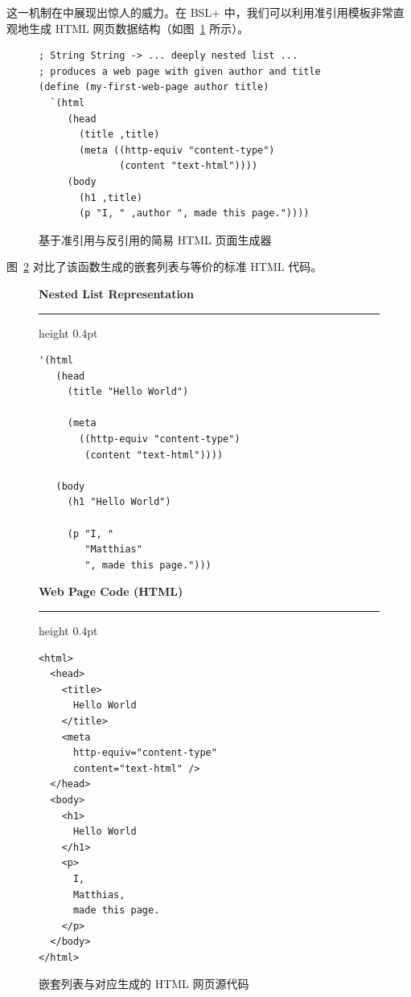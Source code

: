 这一机制在中展现出惊人的威力。在 BSL+ 中，我们可以利用准引用模板非常直观地生成 HTML 网页数据结构（如图~\ref{fig:html_generator} 所示）。

\begin{figure}[htbp]
  \centering
\begin{lstlisting}[language=BSL]
; String String -> ... deeply nested list ...
; produces a web page with given author and title
(define (my-first-web-page author title)
  `(html
     (head
       (title ,title)
       (meta ((http-equiv "content-type")
              (content "text-html"))))
     (body
       (h1 ,title)
       (p "I, " ,author ", made this page."))))
\end{lstlisting}
  \caption{基于准引用与反引用的简易 HTML 页面生成器}
  \label{fig:html_generator}
\end{figure}

图~\ref{fig:nested_lists_webpage} 对比了该函数生成的嵌套列表与等价的标准 HTML 代码。

\begin{figure}[htbp]
  \centering
  \begin{stepperbox}[unbreakable]
    \begin{minipage}[t]{0.47\linewidth}
      \footnotesize\textbf{Nested List Representation}\par
      \vspace{2pt}\hrule height 0.4pt\vspace{3pt}
\begin{Verbatim}[fontsize=\scriptsize]
'(html
   (head
     (title "Hello World")

     (meta
       ((http-equiv "content-type")
        (content "text-html"))))

   (body
     (h1 "Hello World")

     (p "I, "
        "Matthias"
        ", made this page.")))
\end{Verbatim}
    \end{minipage}%
    \hfill
    \begin{minipage}[t]{0.49\linewidth}
      \footnotesize\textbf{Web Page Code (HTML)}\par
      \vspace{2pt}\hrule height 0.4pt\vspace{3pt}
\begin{Verbatim}[fontsize=\scriptsize]
<html>
  <head>
    <title>
      Hello World
    </title>
    <meta
      http-equiv="content-type"
      content="text-html" />
  </head>
  <body>
    <h1>
      Hello World
    </h1>
    <p>
      I,
      Matthias,
      made this page.
    </p>
  </body>
</html>
\end{Verbatim}
    \end{minipage}
  \end{stepperbox}
  \caption{嵌套列表与对应生成的 HTML 网页源代码}
  \label{fig:nested_lists_webpage}
\end{figure}

